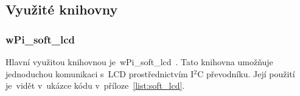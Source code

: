 \subsection{Využité knihovny}
\subsubsection{wPi\_soft\_lcd}
Hlavní využitou knihovnou je~wPi\_soft\_lcd~\cite{wpi-lcd}. Tato knihovna umožňuje jednoduchou komunikaci s~LCD prostřednictvím I$^{2}$C převodníku. Její použití je~vidět v~ukázce kódu v~příloze~\ref{list:soft_lcd}.

